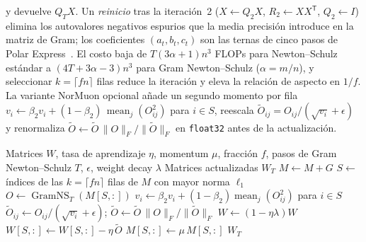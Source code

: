 y devuelve $Q_T X$. Un \emph{reinicio} tras la iteración~2 ($X \gets Q_2 X$, $R_2 \gets X X^{\mathsf T}$, $Q_2 \gets I$) elimina los autovalores negativos espurios que la media precisión introduce en la matriz de Gram; los coeficientes $(a_t,b_t,c_t)$ son las ternas de cinco pasos de Polar Express~\citep{amsel_polar_express_2026}. El costo baja de $T(3\alpha+1)n^3$ FLOPs para Newton--Schulz estándar a $(4T+3\alpha-3)n^3$ para Gram Newton--Schulz ($\alpha = m/n$), y seleccionar $k = \lceil f n \rceil$ filas reduce la iteración y eleva la relación de aspecto en $1/f$. La variante NorMuon opcional añade un segundo momento por fila $v_i \gets \beta_2 v_i + (1-\beta_2)\,\operatorname{mean}_j(O_{ij}^2)$ para $i \in S$, reescala $\tilde O_{ij} = O_{ij}/(\sqrt{v_i}+\epsilon)$ y renormaliza $\tilde O \gets \tilde O\,\lVert O\rVert_F/\lVert\tilde O\rVert_F$ en \texttt{float32} antes de la actualización.

\begin{algorithm}[H]
\caption{Dion3 (Ortogonalización Fraccional con Retroalimentación de Error)}
\label{alg:dion3}
\begin{algorithmic}[1]
\Require Matrices $W$, tasa de aprendizaje $\eta$, momentum $\mu$, fracción $f$, pasos de Gram Newton--Schulz $T$, $\epsilon$, weight decay $\lambda$
\Ensure Matrices actualizadas $W_T$
    \State $M \gets M + G$ 
    \State $S \gets$ índices de las $k = \lceil f n \rceil$ filas de $M$ con mayor norma $\ell_1$ 
    \State $O \gets \operatorname{GramNS}_T(M[S,:])$ 
        \State $v_i \gets \beta_2 v_i + (1-\beta_2)\operatorname{mean}_j(O_{ij}^2)$ para $i \in S$
        \State $\tilde O_{ij} \gets O_{ij}/(\sqrt{v_i}+\epsilon)$; \quad $\tilde O \gets \tilde O\,\lVert O\rVert_F/\lVert\tilde O\rVert_F$
    \EndIf
    \State $W \gets (1 - \eta\lambda) W$ 
    \State $W[S,:] \gets W[S,:] - \eta\,\tilde O$ 
    \State $M[S,:] \gets \mu\, M[S,:]$ 
\EndFor
\Return $W_T$
\end{algorithmic}
\end{algorithm}

